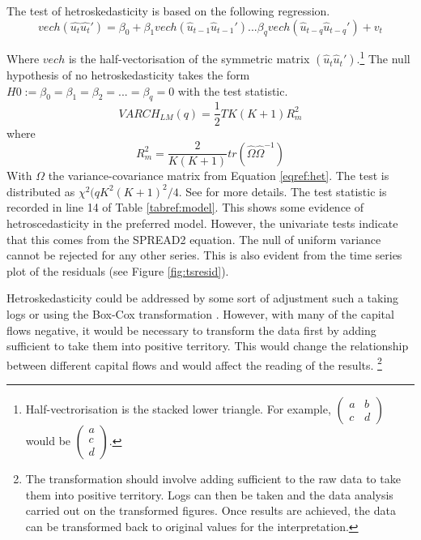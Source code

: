 \documentclass[12pt, a4paper, oneside]{article}\usepackage[]{graphicx}\usepackage[]{color}
\begin{document}
The test of hetroskedasticity is based on the following regression. 
\begin{equation}\label{eqref:het}
vech(\hat{u_t}\hat{u_t}') = \beta_0 + \beta_1 vech(\hat{u}_{t-1}\hat{u}_{t-1}')...\beta_q vech(\hat{u}_{t-q}\hat{u}_{t-q}') + v_t
\end{equation} 

Where $vech$ is the half-vectorisation of the symmetric matrix $(\hat{u}_t\hat{u}_t')$.\footnote{Half-vectrorisation is the stacked lower triangle.  For example, $\begin{pmatrix} a & b \\ c & d \end{pmatrix}$ would be $\begin{pmatrix} a \\ c \\ d \end{pmatrix}$.}  The null hypothesis of no hetroskedasticity takes the form $H0:= \beta_0 = \beta_1 = \beta_2 =...=\beta_q = 0$ with the test statistic. 
\begin{equation}
VARCH_{LM}(q) = \frac{1}{2} T K(K +1)R_m^2
\end{equation}
where 
\begin{equation}
R_m^2 = \frac{2}{K(K+1)}tr(\hat{\Omega}\hat{\Omega}^{-1})
\end{equation}
With $\Omega$ the variance-covariance matrix from Equation \ref{eqref:het}.  The test is distributed as $\chi^2 (qK^2(K + 1)^2/4$.  See \citep{Hamilton} for more details.   The test statistic is recorded in line 14
of Table \ref{tabref:model}.  This shows some evidence of hetroscedasticity in the preferred model.  However, the univariate tests indicate that this comes from the SPREAD2 equation.  The null of uniform variance cannot be rejected for any other series. This is also evident from the time series plot of the residuals (see Figure \ref{fig:tsresid}).

Hetroskedasticity could be addressed by some sort of adjustment such a taking logs or using the Box-Cox transformation \citep{BoxCox}.  However, with many of the capital flows negative, it would be necessary to transform the data first by adding sufficient to take them into positive territory.  This would change the relationship between different capital flows and would affect the reading of the results. \footnote{The transformation should involve adding sufficient to the raw data to take them into positive territory.  Logs can then be taken and the data analysis carried out on the transformed figures.  Once results are achieved, the data can be transformed back to original values for the interpretation.}   
 
\end{document}
